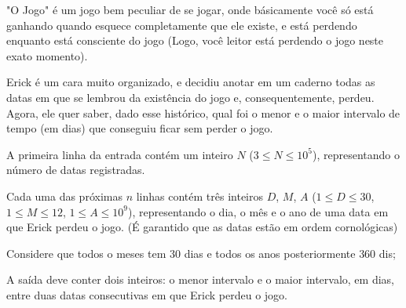 "O Jogo" é um jogo bem peculiar de se jogar, onde básicamente você só está ganhando quando esquece completamente que ele existe, e está perdendo enquanto está consciente do jogo (Logo, você leitor está perdendo o jogo neste exato momento).  

Erick é um cara muito organizado, e decidiu anotar em um caderno todas as datas em que se lembrou da existência do jogo e, consequentemente, perdeu. Agora, ele quer saber, dado esse histórico, qual foi o menor e o maior intervalo de tempo (em dias) que conseguiu ficar sem perder o jogo.

A primeira linha da entrada contém um inteiro $N$ ($3 \leq N \leq 10^5$), representando o número de datas registradas.  

Cada uma das próximas $n$ linhas contém três inteiros $D$, $M$, $A$ ($1 \leq D \leq 30$, $1 \leq M \leq 12$, $1 \leq A \leq 10^9$), representando o dia, o mês e o ano de uma data em que Erick perdeu o jogo. (É garantido que as datas estão em ordem cornológicas)

Considere que todos o meses tem $30$ dias e todos os anos posteriormente $360$ dis;

A saída deve conter dois inteiros: o menor intervalo e o maior intervalo, em dias, entre duas datas consecutivas em que Erick perdeu o jogo.


